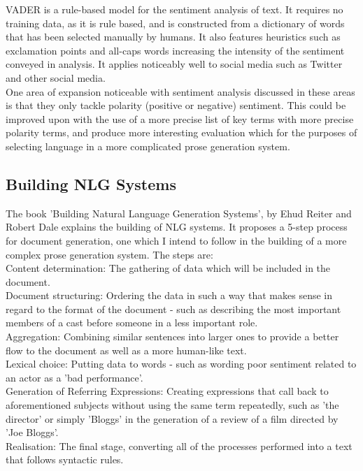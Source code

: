 VADER is a rule-based model for the sentiment analysis of text. It requires no training data, as it is rule based, and is constructed from a dictionary of words that has been selected manually by humans. It also features heuristics such as exclamation points and all-caps words increasing the intensity of the sentiment conveyed in analysis. It applies noticeably well to social media such as Twitter and other social media.\\

One area of expansion noticeable with sentiment analysis discussed in these areas is that they only tackle polarity (positive or negative) sentiment. This could be improved upon with the use of a more precise list of key terms with more precise polarity terms, and produce more interesting evaluation which for the purposes of selecting language in a more complicated prose generation system.

\subsection{Building NLG Systems}
The book 'Building Natural Language Generation Systems', by Ehud Reiter and Robert Dale explains the building of NLG systems. It proposes a 5-step process for document generation, one which I intend to follow in the building of a more complex prose generation system. The steps are:\\
Content determination: The gathering of data which will be included in the document.\\
Document structuring: Ordering the data in such a way that makes sense in regard to the format of the document - such as describing the most important members of a cast before someone in a less important role.\\
Aggregation: Combining similar sentences into larger ones to provide a better flow to the document as well as a more human-like text.\\
Lexical choice: Putting data to words - such as wording poor sentiment related to an actor as a 'bad performance'.\\
Generation of Referring Expressions: Creating expressions that call back to aforementioned subjects without using the same term repeatedly, such as 'the director' or simply 'Bloggs' in the generation of a review of a film directed by 'Joe Bloggs'.\\
Realisation: The final stage, converting all of the processes performed into a text that follows syntactic rules.\\

